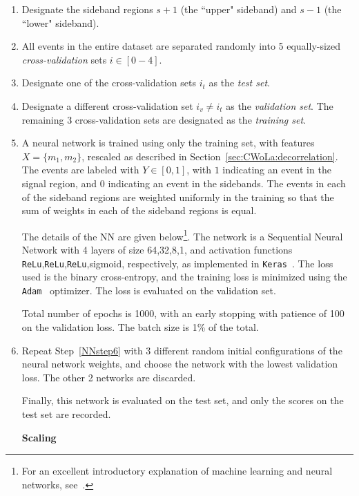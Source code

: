 \begin{enumerate}
  \item Designate the sideband regions $s+1$ (the ``upper" sideband) and $s-1$ (the ``lower" sideband). 
  \label{NNstep2}
  \item All events in the entire dataset are separated randomly into 5 equally-sized \textit{cross-validation} sets $i \in [0-4]$.
  \label{NNstep1}
  \item Designate one of the cross-validation sets $i_t$ as the \textit{test set}.
  \label{NNstep3}
  \item Designate a different cross-validation set $i_v \ne i_t$ as the \textit{validation set}. The remaining 3 cross-validation sets are designated as the \textit{training set}.
  \label{NNstep5}
  \item A neural network is trained using only the training set, with features $X = \{m_1,m_2\}$, rescaled as described in Section~\ref{sec:CWoLa:decorrelation}. The events are labeled with $Y \in [0,1]$, with $1$ indicating an event in the signal region, and $0$ indicating an event in the sidebands. The events in each of the sideband regions are weighted uniformly in the training so that the sum of weights in each of the sideband regions is equal.

  The details of the NN are given below\footnote{For an excellent introductory explanation of machine learning and neural networks, see~\cite{ng2000cs229}.}.
  The network is a Sequential Neural Network with 4 layers of size 64,32,8,1, and activation functions \texttt{ReLu},\texttt{ReLu},\texttt{ReLu},sigmoid, respectively, as implemented in \texttt{Keras}~\cite{chollet2015keras}.
  The loss used is the binary cross-entropy, and the training loss is minimized using the \texttt{Adam}~\cite{kingma2014adam} optimizer.
  The loss is evaluated on the validation set.
  
  Total number of epochs is 1000, with an early stopping with patience of 100 on the validation loss. The batch size is 1\% of the total.

  
  \label{NNstep6}
  \item Repeat Step~\ref{NNstep6} with 3 different random initial configurations of the neural network weights, and choose the network with the lowest validation loss. The other 2 networks are discarded.
  \label{NNstep7}

  Finally, this network is evaluated on the test set, and only the scores on the test set are recorded.

  \textbf{Scaling}
  \label{NNstep7scaling}


\end{enumerate}
